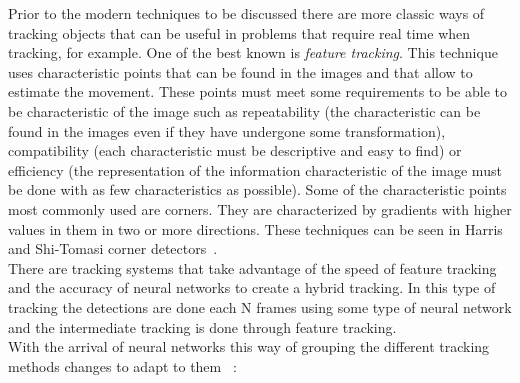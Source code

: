 Prior to the modern techniques to be discussed there are more classic ways of tracking objects that can be useful in problems that require real time when tracking, for example. One of the best known is \textit{feature tracking}. This technique uses characteristic points that can be found in the images and that allow to estimate the movement. These points must meet some requirements to be able to be characteristic of the image such as repeatability (the characteristic can be found in the images even if they have undergone some transformation), compatibility (each characteristic must be descriptive and easy to find) or efficiency (the representation of the information characteristic of the image must be done with as few characteristics as possible). Some of the characteristic points most commonly used are corners. They are characterized by gradients with higher values in them in two or more directions. These techniques can be seen in Harris~\cite{harris1988combined} and Shi-Tomasi corner detectors~\cite{shi1994good}.\\
There are tracking systems that take advantage of the speed of feature tracking and the accuracy of neural networks to create a hybrid tracking. In this type of tracking the detections are done each N frames using some type of neural network and the intermediate tracking is done through feature tracking.\\
With the arrival of neural networks this way of grouping the different tracking methods changes to adapt to them ~\cite{held2016learning}:
